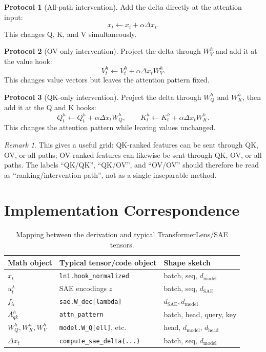 \documentclass[11pt]{article}
\newcommand{\dm}{d_{\mathrm{model}}}
\newcommand{\dhead}{d_{\mathrm{head}}}
\newcommand{\dsae}{d_{\mathrm{SAE}}}
\newcommand{\hook}[1]{\texttt{#1}}
\theoremstyle{definition}
\newtheorem{protocol}{Protocol}
\theoremstyle{plain}
\theoremstyle{remark}
\newtheorem{remark}{Remark}
\begin{document}
\begin{protocol}[All-path intervention]
Add the delta directly at the attention input:
\[
  x_t \leftarrow x_t + \alpha \Delta x_t.
\]
This changes Q, K, and V simultaneously.
\end{protocol}

\begin{protocol}[OV-only intervention]
Project the delta through \(W_V^h\) and add it at the value hook:
\[
  V_t^h \leftarrow V_t^h + \alpha \Delta x_t W_V^h.
\]
This changes value vectors but leaves the attention pattern fixed.
\end{protocol}

\begin{protocol}[QK-only intervention]
Project the delta through \(W_Q^h\) and \(W_K^h\), then add it at the Q and K
hooks:
\[
  Q_t^h \leftarrow Q_t^h + \alpha \Delta x_t W_Q^h,
  \qquad
  K_t^h \leftarrow K_t^h + \alpha \Delta x_t W_K^h.
\]
This changes the attention pattern while leaving values unchanged.
\end{protocol}

\begin{remark}
This gives a useful grid: QK-ranked features can be sent through QK, OV, or all
paths; OV-ranked features can likewise be sent through QK, OV, or all paths.
The labels ``QK/QK'', ``QK/OV'', and ``OV/OV'' should therefore be read as
``ranking/intervention-path'', not as a single inseparable method.
\end{remark}

\section{Implementation Correspondence}

\begin{table}[h]
  \centering
  \begin{tabular}{lll}
    \toprule
    Math object & Typical tensor/code object & Shape sketch \\
    \midrule
    \(x_t\) & \hook{ln1.hook\_normalized} & batch, seq, \(\dm\) \\
    \(u_t^\lambda\) & SAE encodings \(z\) & batch, seq, \(\dsae\) \\
    \(f_\lambda\) & \hook{sae.W\_dec[lambda]} & \(\dsae, \dm\) \\
    \(A_{qk}^h\) & \hook{attn\_pattern} & batch, head, query, key \\
    \(W_Q^h,W_K^h,W_V^h\) & \hook{model.W\_Q[ell]}, etc. & head, \(\dm\), \(\dhead\) \\
    \(\Delta x_t\) & \hook{compute\_sae\_delta(...)} & batch, seq, \(\dm\) \\
    \bottomrule
  \end{tabular}
  \caption{Mapping between the derivation and typical TransformerLens/SAE tensors.}
\end{table}
\end{document}
